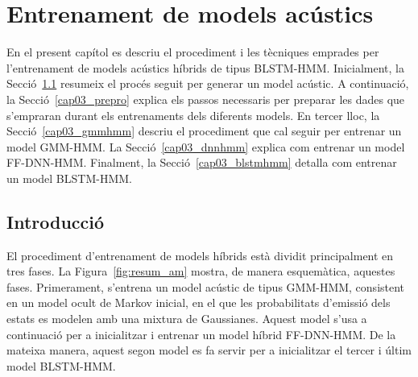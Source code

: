 
    \chapter{Entrenament de models acústics}
    \label{cap03__}


En el present capítol es descriu el procediment i les tècniques emprades per l'entrenament de models acústics híbrids de tipus BLSTM-HMM.
Inicialment, la Secció~\ref{cap03_intro} resumeix el procés seguit per generar un model acústic.
A continuació, la Secció~\ref{cap03_prepro} explica els passos necessaris per preparar les dades que s'empraran durant els entrenaments dels diferents models.
En tercer lloc, la Secció~\ref{cap03_gmmhmm} descriu el procediment que cal seguir per entrenar un model GMM-HMM.
La Secció~\ref{cap03_dnnhmm} explica com entrenar un model FF-DNN-HMM.
Finalment, la Secció~\ref{cap03_blstmhmm} detalla com entrenar un model BLSTM-HMM.
 
\section{Introducció}
\label{cap03_intro}

El procediment d'entrenament de models híbrids està dividit principalment en tres fases.
La Figura~\ref{fig:resum_am} mostra, de manera esquemàtica, aquestes fases.
Primerament, s'entrena un model acústic de tipus GMM-HMM, consistent en un model ocult de Markov inicial, en el que les probabilitats d'emissió dels estats es modelen amb una mixtura de Gaussianes. Aquest model s'usa a continuació per a inicialitzar i entrenar un model híbrid FF-DNN-HMM. De la mateixa manera, aquest segon model es fa servir per a inicialitzar el tercer i últim model BLSTM-HMM.

